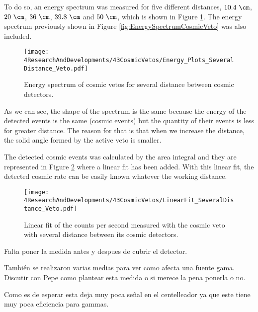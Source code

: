 To do so, an energy spectrum was measured for five different distances, $10.4~\cm$, $20~\cm$, $36~\cm$, $39.8~\cm$ and $50~\cm$, which is shown in Figure \ref{fig:EnergySpectrumsSeveralDistanceVeto}. The energy spectrum previously shown in Figure \ref{fig:EnergySpectrumCosmicVeto} was also included. 

\begin{figure}[h]
\centering
\texttt{[image: 4ResearchAndDevelopments/43CosmicVetos/Energy\_Plots\_SeveralDistance\_Veto.pdf]}
\caption{Energy spectrum of cosmic vetos for several distance between cosmic detectors.\label{fig:EnergySpectrumsSeveralDistanceVeto}}
\end{figure}

As we can see, the shape of the spectrum is the same because the energy of the detected events is the same (cosmic events) but the quantity of their events is less for greater distance. The reason for that is that when we increase the distance, the solid angle formed by the active veto is smaller.

The detected cosmic events was calculated by the area integral and they are represented in Figure \ref{fig:LinearFitSeveralDistanceVeto} where a linear fit has been added. With this linear fit, the detected cosmic rate can be easily known whatever the working distance. 

\begin{figure}[h]
\centering
\texttt{[image: 4ResearchAndDevelopments/43CosmicVetos/LinearFit\_SeveralDistance\_Veto.pdf]}
\caption{Linear fit of the counts per second measured with the cosmic veto with several distance between its cosmic detectors.\label{fig:LinearFitSeveralDistanceVeto}}
\end{figure}



Falta poner la medida antes y despues de cubrir el detector.

También se realizaron varias medias para ver como afecta una fuente gama. Discutir con Pepe como plantear esta medida o si merece la pena ponerla o no.

Como es de esperar esta deja muy poca señal en el centelleador ya que este tiene muy poca eficiencia para gammas.